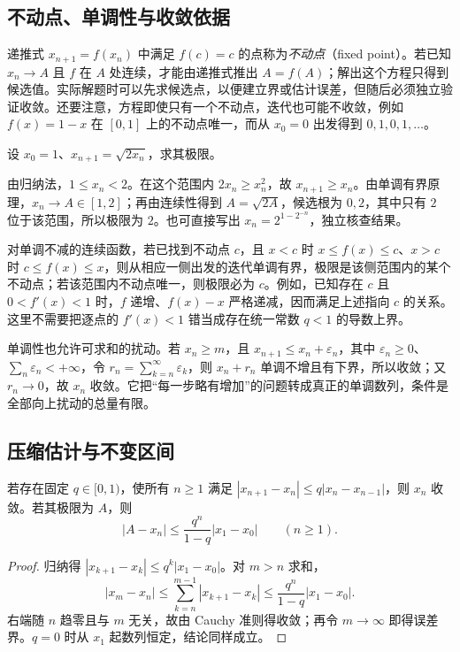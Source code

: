 \subsection{不动点、单调性与收敛依据}

递推式 $x_{n+1}=f(x_n)$ 中满足 $f(c)=c$ 的点称为\emph{不动点}（fixed point）。若已知 $x_n\to A$ 且 $f$ 在 $A$ 处连续，才能由递推式推出 $A=f(A)$；解出这个方程只得到候选值。实际解题时可以先求候选点，以便建立界或估计误差，但随后必须独立验证收敛。还要注意，方程即使只有一个不动点，迭代也可能不收敛，例如 $f(x)=1-x$ 在 $[0,1]$ 上的不动点唯一，而从 $x_0=0$ 出发得到 $0,1,0,1,\ldots$。

\begin{example}
\label{ex:pei-square-root-recursion}
设 $x_0=1$、$x_{n+1}=\sqrt{2x_n}$，求其极限。
\end{example}
\begin{solve}
由归纳法，$1\le x_n<2$。在这个范围内 $2x_n\ge x_n^2$，故 $x_{n+1}\ge x_n$。由单调有界原理，$x_n\to A\in[1,2]$；再由连续性得到 $A=\sqrt{2A}$，候选根为 $0,2$，其中只有 $2$ 位于该范围，所以极限为 $2$。也可直接写出 $x_n=2^{1-2^{-n}}$，独立核查结果。
\end{solve}

对单调不减的连续函数，若已找到不动点 $c$，且 $x<c$ 时 $x\le f(x)\le c$、$x>c$ 时 $c\le f(x)\le x$，则从相应一侧出发的迭代单调有界，极限是该侧范围内的某个不动点；若该范围内不动点唯一，则极限必为 $c$。例如，已知存在 $c$ 且 $0<f'(x)<1$ 时，$f$ 递增、$f(x)-x$ 严格递减，因而满足上述指向 $c$ 的关系。这里不需要把逐点的 $f'(x)<1$ 错当成存在统一常数 $q<1$ 的导数上界。

单调性也允许可求和的扰动。若 $x_n\ge m$，且 $x_{n+1}\le x_n+\varepsilon_n$，其中 $\varepsilon_n\ge0$、$\sum_n\varepsilon_n<+\infty$，令 $r_n=\sum_{k=n}^\infty\varepsilon_k$，则 $x_n+r_n$ 单调不增且有下界，所以收敛；又 $r_n\to0$，故 $x_n$ 收敛。它把“每一步略有增加”的问题转成真正的单调数列，条件是全部向上扰动的总量有限。

\subsection{压缩估计与不变区间}

\begin{theorem}[相邻差的压缩判别]
\label{thm:pei-contractive-differences}
若存在固定 $q\in[0,1)$，使所有 $n\ge1$ 满足 $|x_{n+1}-x_n|\le q|x_n-x_{n-1}|$，则 $x_n$ 收敛。若其极限为 $A$，则
\begin{equation}
    |A-x_n|\le\frac{q^n}{1-q}|x_1-x_0|\qquad(n\ge1).
    \label{eq:pei-contraction-error}
\end{equation}
\end{theorem}
\begin{proof}
归纳得 $|x_{k+1}-x_k|\le q^k|x_1-x_0|$。对 $m>n$ 求和，
\[
    |x_m-x_n|\le\sum_{k=n}^{m-1}|x_{k+1}-x_k|
    \le\frac{q^n}{1-q}|x_1-x_0|.
\]
右端随 $n$ 趋零且与 $m$ 无关，故由 Cauchy 准则得收敛；再令 $m\to\infty$ 即得误差界。$q=0$ 时从 $x_1$ 起数列恒定，结论同样成立。
\end{proof}

